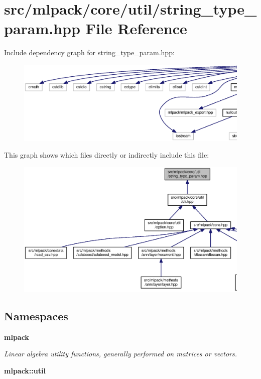 \section{src/mlpack/core/util/string\+\_\+type\+\_\+param.hpp File Reference}
\label{string__type__param_8hpp}
Include dependency graph for string\+\_\+type\+\_\+param.\+hpp\+:
\nopagebreak
\begin{figure}[H]
\begin{center}
\leavevmode
\includegraphics[width=350pt]{string__type__param_8hpp__incl}
\end{center}
\end{figure}
This graph shows which files directly or indirectly include this file\+:
\nopagebreak
\begin{figure}[H]
\begin{center}
\leavevmode
\includegraphics[width=350pt]{string__type__param_8hpp__dep__incl}
\end{center}
\end{figure}
\subsection*{Namespaces}
\begin{DoxyCompactItemize}
\item 
 {\bf mlpack}
\begin{DoxyCompactList}\small\item\em Linear algebra utility functions, generally performed on matrices or vectors. \end{DoxyCompactList}\item 
 {\bf mlpack\+::util}
\end{DoxyCompactItemize}
